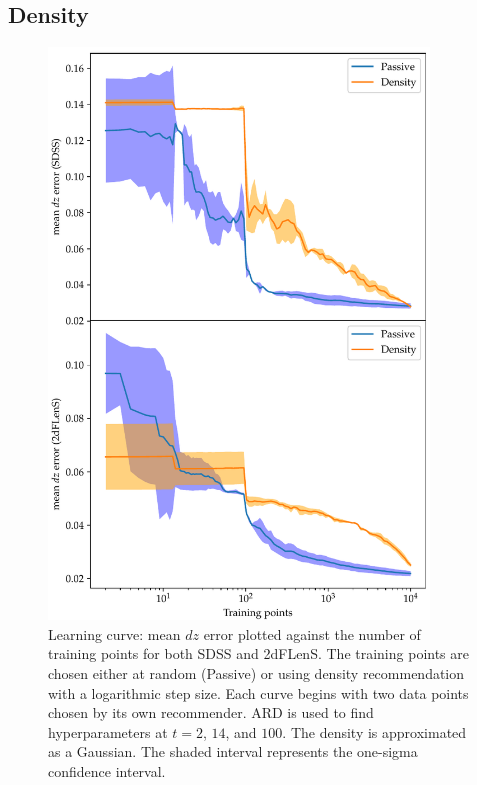 \documentclass[11pt,twoside,openright]{report}
\begin{document}
\subsection{Density}

  \begin{figure}
    \centering
    \includegraphics[width=0.9\textwidth]{density_dz1.pdf}
    \caption{Learning curve: mean $dz$ error plotted against the number of training points for both SDSS and 2dFLenS. The training points are chosen either at random (Passive) or using density recommendation with a logarithmic step size. Each curve begins with two data points chosen by its own recommender. ARD is used to find hyperparameters at $t=2$, $14$, and $100$. The density is approximated as a Gaussian. The shaded interval represents the one-sigma confidence interval.}
    \label{fig:density_dz1}
  \end{figure}
\end{document}
